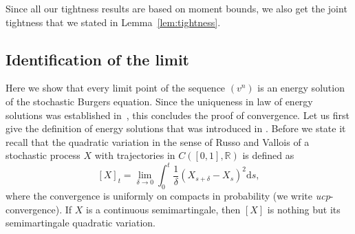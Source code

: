 \documentclass[11pt, a4paper]{article}
\newcommand{\mathd}{\mathrm{d}}
\newcommand{\tmtextit}[1]{{\itshape{#1}}}
\newcommand{\1}{\mathbf{1}}
\begin{document}
Since all our tightness results are based on moment bounds, we also get the
joint tightness that we stated in Lemma~\ref{lem:tightness}.

\subsection{Identification of the limit}\label{sec:limit}

Here we show that every limit point of the sequence $(v^n)$ is an energy
solution of the stochastic Burgers equation. Since the uniqueness in law
of energy solutions was established in~\cite{bib:energyUniqueness}, this concludes the proof of
convergence. Let us first give the definition of energy solutions that was
introduced in \cite{bib:gubinelliJara}. Before we state it recall that the
quadratic variation in the sense of Russo and Vallois \cite{bib:russoVallois}
of a stochastic process $X$ with trajectories in $C ([0, 1],
\mathbb{R})$ is defined as
\[ [X]_t = \lim_{\delta \rightarrow 0} \int_0^t \frac{1}{\delta}
   (X_{s + \delta} - X_s)^2 \mathd s, \]
where the convergence is uniformly on compacts in probability (we write
\tmtextit{ucp}-convergence). If $X$ is a continuous semimartingale, then $[X]$
is nothing but its semimartingale quadratic variation.
\end{document}
